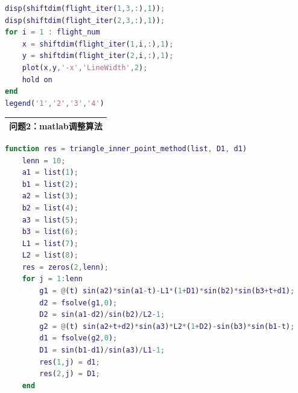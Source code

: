 \documentclass{my_paper}
\begin{document}
\begin{lstlisting}[language=Matlab]
% 绘图
disp(shiftdim(flight_iter(1,3,:),1));
disp(shiftdim(flight_iter(2,3,:),1));
for i = 1 : flight_num
    x = shiftdim(flight_iter(1,i,:),1);
    y = shiftdim(flight_iter(2,i,:),1);
    plot(x,y,'-x','LineWidth',2);
    hold on
end
legend('1','2','3','4')
\end{lstlisting}


\begin{table}[htbp]
    \centering
    \begin{tabular}{|p{14.0cm}|}
    \hline
    \textbf{问题2：matlab调整算法} \\ %
    \hline
    \end{tabular}
\end{table}

\begin{lstlisting}[language=Matlab]
    function res = triangle_inner_point_method(list, D1, d1)
    lenn = 10;
    a1 = list(1);
    b1 = list(2);
    a2 = list(3);
    b2 = list(4); 
    a3 = list(5);
    b3 = list(6);
    L1 = list(7);
    L2 = list(8);
    res = zeros(2,lenn);
    for j = 1:lenn
        g1 = @(t) sin(a2)*sin(a1-t)-L1*(1+D1)*sin(b2)*sin(b3+t+d1);
        d2 = fsolve(g1,0);
        D2 = sin(a1-d2)/sin(b2)/L2-1;
        g2 = @(t) sin(a2+t+d2)*sin(a3)*L2*(1+D2)-sin(b3)*sin(b1-t);
        d1 = fsolve(g2,0);
        D1 = sin(b1-d1)/sin(a3)/L1-1;
        res(1,j) = d1;
        res(2,j) = D1;
    end    
\end{lstlisting}
\end{document}

